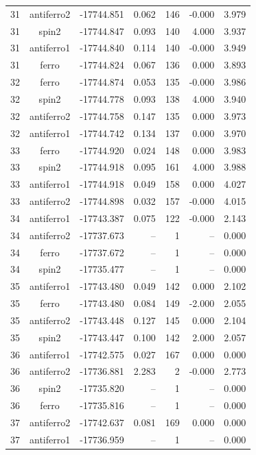 \begin{longtable}{@{}ccrrrrr@{}}
\rowcolor{gray!20} 31 & antiferro2 & -17744.851 & 0.062 & 146 & -0.000 & 3.979 \\
31 & spin2 & -17744.847 & 0.093 & 140 & 4.000 & 3.937 \\
31 & antiferro1 & -17744.840 & 0.114 & 140 & -0.000 & 3.949 \\
31 & ferro & -17744.824 & 0.067 & 136 & 0.000 & 3.893 \\
\rowcolor{gray!20} 32 & ferro & -17744.874 & 0.053 & 135 & -0.000 & 3.986 \\
32 & spin2 & -17744.778 & 0.093 & 138 & 4.000 & 3.940 \\
32 & antiferro2 & -17744.758 & 0.147 & 135 & 0.000 & 3.973 \\
32 & antiferro1 & -17744.742 & 0.134 & 137 & 0.000 & 3.970 \\
\rowcolor{gray!20} 33 & ferro & -17744.920 & 0.024 & 148 & 0.000 & 3.983 \\
33 & spin2 & -17744.918 & 0.095 & 161 & 4.000 & 3.988 \\
33 & antiferro1 & -17744.918 & 0.049 & 158 & 0.000 & 4.027 \\
33 & antiferro2 & -17744.898 & 0.032 & 157 & -0.000 & 4.015 \\
\rowcolor{gray!20} 34 & antiferro1 & -17743.387 & 0.075 & 122 & -0.000 & 2.143 \\
34 & antiferro2 & -17737.673 & -- & 1 & -- & 0.000 \\
34 & ferro & -17737.672 & -- & 1 & -- & 0.000 \\
34 & spin2 & -17735.477 & -- & 1 & -- & 0.000 \\
\rowcolor{gray!20} 35 & antiferro1 & -17743.480 & 0.049 & 142 & 0.000 & 2.102 \\
35 & ferro & -17743.480 & 0.084 & 149 & -2.000 & 2.055 \\
35 & antiferro2 & -17743.448 & 0.127 & 145 & 0.000 & 2.104 \\
35 & spin2 & -17743.447 & 0.100 & 142 & 2.000 & 2.057 \\
\rowcolor{gray!20} 36 & antiferro1 & -17742.575 & 0.027 & 167 & 0.000 & 0.000 \\
36 & antiferro2 & -17736.881 & 2.283 & 2 & -0.000 & 2.773 \\
36 & spin2 & -17735.820 & -- & 1 & -- & 0.000 \\
36 & ferro & -17735.816 & -- & 1 & -- & 0.000 \\
\rowcolor{gray!20} 37 & antiferro2 & -17742.637 & 0.081 & 169 & 0.000 & 0.000 \\
37 & antiferro1 & -17736.959 & -- & 1 & -- & 0.000 \\

\end{longtable}
